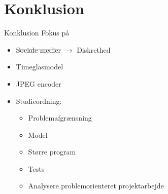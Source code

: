 \section{Konklusion}
\begin{frame}{Konklusion}
    Fokus på
    \begin{itemize}
        \item{\sout{Sociale medier} $\rightarrow$ Diskrethed}
        \item {Timeglasmodel}
        \item JPEG encoder
        \item Studieordning:
        \begin{itemize}
            \item\textcolor{green}{\checkmark} Problemafgrænsning
            \item\textcolor{green}{\checkmark} Model
            \item\textcolor{green}{\checkmark} Større program
            \item\textcolor{green}{\checkmark} Tests
            \item\textcolor{green}{\checkmark} Analysere problemorienteret projektarbejde
            \end{itemize}
    \end{itemize}
\end{frame}
